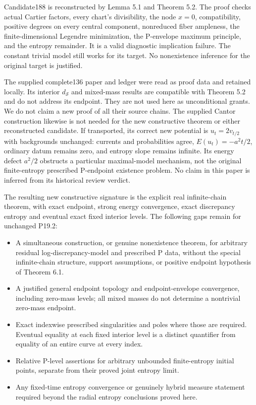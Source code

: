 \documentclass[
  11pt,
]{article}
\providecommand{\tightlist}{%
  \setlength{\itemsep}{0pt}\setlength{\parskip}{0pt}}
\begin{document}
Candidate188 is reconstructed by Lemma 5.1 and Theorem 5.2. The proof
checks actual Cartier factors, every chart's divisibility, the node
\(x=0\), compatibility, positive degrees on every central component,
nonreduced fiber ampleness, the finite-dimensional Legendre
minimization, the P-envelope maximum principle, and the entropy
remainder. It is a valid diagnostic implication failure. The constant
trivial model still works for its target. No nonexistence inference for
the original target is justified.

The supplied complete136 paper and ledger were read as proof data and
retained locally. Its interior \(d_{\mathcal S}\) and mixed-mass results
are compatible with Theorem 5.2 and do not address its endpoint. They
are not used here as unconditional grants. We do not claim a new proof
of all their source chains. The supplied Cantor construction likewise is
not needed for the new constructive theorem or either reconstructed
candidate. If transported, its correct new potential is \(u_t=2v_{t/2}\)
with backgrounds unchanged: currents and probabilities agree,
\(E(u_t)=-a^2t/2\), ordinary datum remains zero, and entropy slope
remains infinite. Its energy defect \(a^2/2\) obstructs a particular
maximal-model mechanism, not the original finite-entropy prescribed
P-endpoint existence problem. No claim in this paper is inferred from
its historical review verdict.

The resulting new constructive signature is the explicit real
infinite-chain theorem, with exact endpoint, strong energy convergence,
exact discrepancy entropy and eventual exact fixed interior levels. The
following gaps remain for unchanged P19.2:

\begin{itemize}
\tightlist
\item
  A simultaneous construction, or genuine nonexistence theorem, for
  arbitrary residual log-discrepancy-model and prescribed P data,
  without the special infinite-chain structure, support assumptions, or
  positive endpoint hypothesis of Theorem 6.1.
\item
  A justified general endpoint topology and endpoint-envelope
  convergence, including zero-mass levels; all mixed masses do not
  determine a nontrivial zero-mass endpoint.
\item
  Exact indexwise prescribed singularities and poles where those are
  required. Eventual equality at each fixed interior level is a distinct
  quantifier from equality of an entire curve at every index.
\item
  Relative P-level assertions for arbitrary unbounded finite-entropy
  initial points, separate from their proved joint entropy limit.
\item
  Any fixed-time entropy convergence or genuinely hybrid measure
  statement required beyond the radial entropy conclusions proved here.
\end{itemize}
\end{document}
